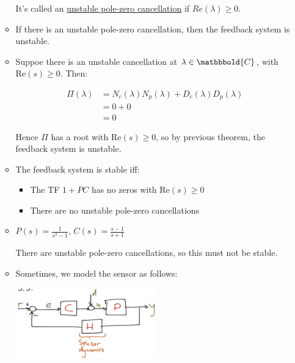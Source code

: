 \begin{enumerate}
\begin{itemize}
                    It's called an \uline{unstable pole-zero cancellation} if $Re(\lambda) \ge 0$.

                \item \corollary If there is an unstable pole-zero cancellation, then the feedback system is unstable.

                \item \proof
                    Suppoe there is an unstable cancellation at $\lambda \in \mathbbold{C}$, with $\text{Re}(s) \ge 0$.
                    Then:

                    \begin{align*}
                        \Pi(\lambda) &= N_c(\lambda) N_p(\lambda) + D_c(\lambda) D_p(\lambda) \\
                        &= 0 + 0 \\
                        &= 0
                    \end{align*}

                    Hence $\Pi$ has a root with $\text{Re}(s) \ge 0$, so by previous theorem, the feedback system is unstable.

                \item \theorem The feedback system is stable iff:
                    \begin{itemize}
                        \item The TF $1 + PC$ has no zeros with $\text{Re}(s) \ge 0$
                        \item There are no unstable pole-zero cancellations
                    \end{itemize}

                \item \example $P(s) = \frac{1}{s^2 -1}$, $C(s) = \frac{s-1}{s+1}$

                    There are unstable pole-zero cancellations, so this must not be stable.

                \item \rmk Sometimes, we model the sensor as follows:

                    \begin{center}\includegraphics[width=0.5\textwidth,keepaspectratio]{images/5-5.png}\end{center}


\end{itemize}
\end{enumerate}
